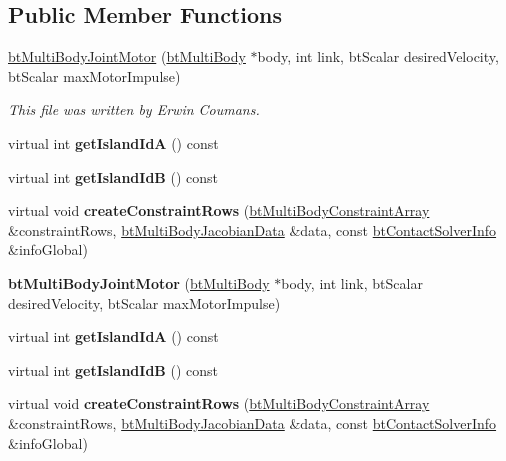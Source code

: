 \subsection*{Public Member Functions}
\begin{DoxyCompactItemize}
\item 
\mbox{\label{classbtMultiBodyJointMotor_a6bc2a411ab80cbe9bdc2b59c1f582874}} 
\hyperlink{classbtMultiBodyJointMotor_a6bc2a411ab80cbe9bdc2b59c1f582874}{bt\+Multi\+Body\+Joint\+Motor} (\hyperlink{classbtMultiBody}{bt\+Multi\+Body} $\ast$body, int link, bt\+Scalar desired\+Velocity, bt\+Scalar max\+Motor\+Impulse)
\begin{DoxyCompactList}\small\item\em This file was written by Erwin Coumans. \end{DoxyCompactList}\item 
\mbox{\label{classbtMultiBodyJointMotor_acef38eb291d2d02f2f81fcb6e2aa6ab1}} 
virtual int {\bfseries get\+Island\+IdA} () const
\item 
\mbox{\label{classbtMultiBodyJointMotor_a3c6a2ceda1dc36cbf3468e21d96acb55}} 
virtual int {\bfseries get\+Island\+IdB} () const
\item 
\mbox{\label{classbtMultiBodyJointMotor_ab8c953712a4b79792e7eb1e5a59d6d46}} 
virtual void {\bfseries create\+Constraint\+Rows} (\hyperlink{classbtAlignedObjectArray}{bt\+Multi\+Body\+Constraint\+Array} \&constraint\+Rows, \hyperlink{structbtMultiBodyJacobianData}{bt\+Multi\+Body\+Jacobian\+Data} \&data, const \hyperlink{structbtContactSolverInfo}{bt\+Contact\+Solver\+Info} \&info\+Global)
\item 
\mbox{\label{classbtMultiBodyJointMotor_a6bc2a411ab80cbe9bdc2b59c1f582874}} 
{\bfseries bt\+Multi\+Body\+Joint\+Motor} (\hyperlink{classbtMultiBody}{bt\+Multi\+Body} $\ast$body, int link, bt\+Scalar desired\+Velocity, bt\+Scalar max\+Motor\+Impulse)
\item 
\mbox{\label{classbtMultiBodyJointMotor_aba0fe6f2b697ba78b78dc9a916342280}} 
virtual int {\bfseries get\+Island\+IdA} () const
\item 
\mbox{\label{classbtMultiBodyJointMotor_a5704b4ae6a8fe9f45c44111b7088383b}} 
virtual int {\bfseries get\+Island\+IdB} () const
\item 
\mbox{\label{classbtMultiBodyJointMotor_ad68f578e7a44acc8a8d7dcbe702c76e4}} 
virtual void {\bfseries create\+Constraint\+Rows} (\hyperlink{classbtAlignedObjectArray}{bt\+Multi\+Body\+Constraint\+Array} \&constraint\+Rows, \hyperlink{structbtMultiBodyJacobianData}{bt\+Multi\+Body\+Jacobian\+Data} \&data, const \hyperlink{structbtContactSolverInfo}{bt\+Contact\+Solver\+Info} \&info\+Global)
\end{DoxyCompactItemize}
